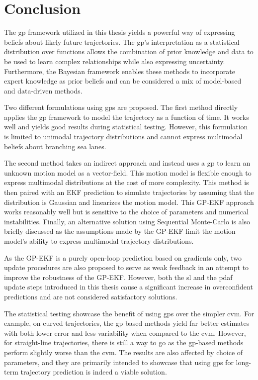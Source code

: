 \chapter{Conclusion}\label{chap:conclusion}
The \acrshort{gp} framework utilized in this thesis yields a powerful way of expressing beliefs about likely future trajectories. The \acrshort{gp}'s interpretation as a statistical distribution over functions allows the combination of prior knowledge and data to be used to learn complex relationships while also expressing uncertainty. Furthermore, the Bayesian framework enables these methods to incorporate expert knowledge as prior beliefs and can be considered a mix of model-based and data-driven methods. 


Two different formulations using \acrshort{gp}s are proposed. The first method directly applies the \acrshort{gp} framework to model the trajectory as a function of time. It works well and yields good results during statistical testing. However, this formulation is limited to unimodal trajectory distributions and cannot express multimodal beliefs about branching sea lanes. 

The second method takes an indirect approach and instead uses a \acrshort{gp} to learn an unknown motion model as a vector-field. This motion model is flexible enough to express multimodal distributions at the cost of more complexity. This method is then paired with an EKF prediction to simulate trajectories by assuming that the distribution is Gaussian and linearizes the motion model. This GP-EKF approach works reasonably well but is sensitive to the choice of parameters and numerical instabilities. Finally, an alternative solution using Sequential Monte-Carlo is also briefly discussed as the assumptions made by the GP-EKF limit the motion model's ability to express multimodal trajectory distributions.  

As the GP-EKF is a purely open-loop prediction based on gradients only, two update procedures are also proposed to serve as weak feedback in an attempt to improve the robustness of the GP-EKF. However, both the \acrshort{sl} and the \acrshort{pdaf} update steps introduced in this thesis cause a significant increase in overconfident predictions and are not considered satisfactory solutions. 

The statistical testing showcase the benefit of using \acrshort{gp}s over the simpler \acrshort{cvm}. For example, on curved trajectories, the \acrshort{gp} based methods yield far better estimates with both lower error and less variability when compared to the \acrshort{cvm}. However, for straight-line trajectories, there is still a way to go as the \acrshort{gp}-based methods perform slightly worse than the \acrshort{cvm}. The results are also affected by choice of parameters, and they are primarily intended to showcase that using \acrshort{gp}s for long-term trajectory prediction is indeed a viable solution.

